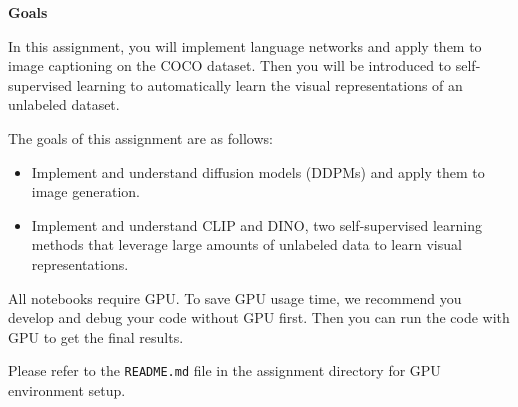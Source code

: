 \textbf{Goals}

In this assignment, you will implement language networks and apply them to image captioning on the COCO dataset. Then you will be introduced to self-supervised learning to automatically learn the visual representations of an unlabeled dataset.

The goals of this assignment are as follows:

\begin{itemize}
    \item Implement and understand diffusion models (DDPMs) and apply them to image generation.
    \item Implement and understand CLIP and DINO, two self-supervised learning methods that leverage large amounts of unlabeled data to learn visual representations.
\end{itemize}

All notebooks require GPU. To save GPU usage time, we recommend you develop and debug your code without GPU first. Then you can run the code with GPU to get the final results.

Please refer to the \texttt{README.md} file in the assignment directory for GPU environment setup.

\newpage